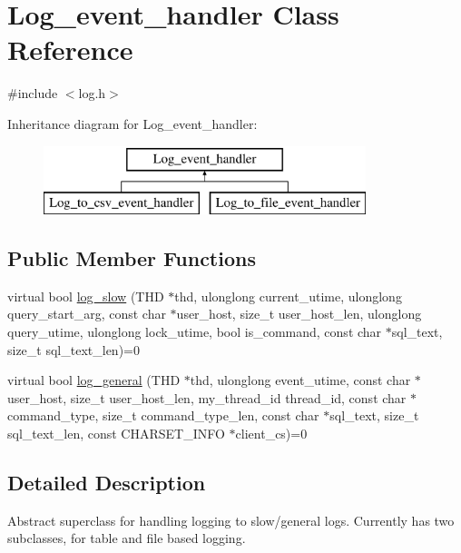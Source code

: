 \hypertarget{classLog__event__handler}{}\section{Log\+\_\+event\+\_\+handler Class Reference}
\label{classLog__event__handler}


{\ttfamily \#include $<$log.\+h$>$}

Inheritance diagram for Log\+\_\+event\+\_\+handler\+:\begin{figure}[H]
\begin{center}
\leavevmode
\includegraphics[height=2.000000cm]{classLog__event__handler}
\end{center}
\end{figure}
\subsection*{Public Member Functions}
\begin{DoxyCompactItemize}
\item 
virtual bool \mbox{\hyperlink{classLog__event__handler_a4a391622d5b047d66ed8466ffa2af98b}{log\+\_\+slow}} (T\+HD $\ast$thd, ulonglong current\+\_\+utime, ulonglong query\+\_\+start\+\_\+arg, const char $\ast$user\+\_\+host, size\+\_\+t user\+\_\+host\+\_\+len, ulonglong query\+\_\+utime, ulonglong lock\+\_\+utime, bool is\+\_\+command, const char $\ast$sql\+\_\+text, size\+\_\+t sql\+\_\+text\+\_\+len)=0
\item 
virtual bool \mbox{\hyperlink{classLog__event__handler_aa9f98b8c0b48eb846877fe9d2496560e}{log\+\_\+general}} (T\+HD $\ast$thd, ulonglong event\+\_\+utime, const char $\ast$user\+\_\+host, size\+\_\+t user\+\_\+host\+\_\+len, my\+\_\+thread\+\_\+id thread\+\_\+id, const char $\ast$command\+\_\+type, size\+\_\+t command\+\_\+type\+\_\+len, const char $\ast$sql\+\_\+text, size\+\_\+t sql\+\_\+text\+\_\+len, const C\+H\+A\+R\+S\+E\+T\+\_\+\+I\+N\+FO $\ast$client\+\_\+cs)=0
\end{DoxyCompactItemize}


\subsection{Detailed Description}
Abstract superclass for handling logging to slow/general logs. Currently has two subclasses, for table and file based logging. 

